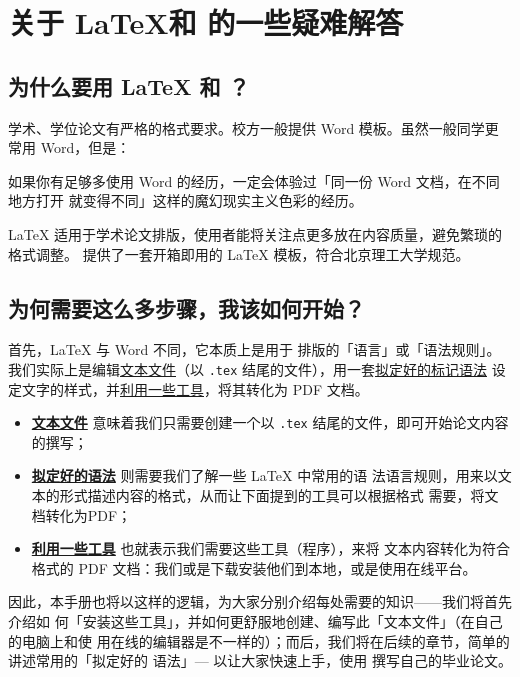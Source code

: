 \chapter{关于 \LaTeX 和 \BIThesis 的一些疑难解答}
\label{chap:what}

\section{为什么要用 \LaTeX{} 和 \BIThesis{}？}

学术、学位论文有严格的格式要求。校方一般提供 Word 模板。虽然一般同学更常用 Word，但是：
\begin{center}
  \kaishu
  如果你有足够多使用 Word 的经历，一定会体验过「同一份 Word 文档，在不同地方打开
  就变得不同」这样的魔幻现实主义色彩的经历。
\end{center}

\LaTeX{} 适用于学术论文排版，使用者能将关注点更多放在内容质量，避免繁琐的格式调整。
\BIThesis{} 提供了一套开箱即用的 \LaTeX{} 模板，符合北京理工大学规范。

\section{为何需要这么多步骤，我该如何开始？}

首先，\LaTeX{} 与 Word 不同，它本质上是用于
排版的「语言」或「语法规则」。我们实际上是编辑\underline{文本文件}（以
\texttt{.tex} 结尾的文件），用一套\underline{拟定好的标记语法}
设定文字的样式，并\underline{利用一些工具}，将其转化为 PDF 文档。

\begin{itemize}[noitemsep]
  \item \textbf{\underline{文本文件}} 意味着我们只需要创建一个以 \texttt{.tex}
  结尾的文件，即可开始论文内容的撰写；
  \item \textbf{\underline{拟定好的语法}} 则需要我们了解一些 \LaTeX{} 中常用的语
  法语言规则，用来以文本的形式描述内容的格式，从而让下面提到的工具可以根据格式
  需要，将文档转化为PDF；
  \item \textbf{\underline{利用一些工具}} 也就表示我们需要这些工具（程序），来将
  文本内容转化为符合格式的 PDF 文档：我们或是下载安装他们到本地，或是使用在线平台。
\end{itemize}

因此，本手册也将以这样的逻辑，为大家分别介绍每处需要的知识——我们将首先介绍如
何「安装这些工具」，并如何更舒服地创建、编写此「文本文件」（在自己的电脑上和使
用在线的编辑器是不一样的）；而后，我们将在后续的章节，简单的讲述常用的「拟定好的
语法」--- 以让大家快速上手，使用 \BIThesis{} 撰写自己的毕业论文。

